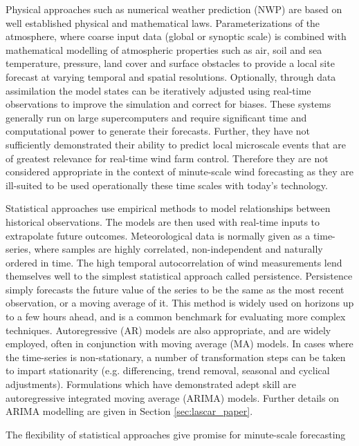 Physical approaches such as numerical weather prediction (NWP) are based on well established physical and mathematical laws. Parameterizations of the atmosphere, where coarse input data (global or synoptic scale) is combined with mathematical modelling of atmospheric properties such as air, soil and sea temperature, pressure, land cover and surface obstacles to provide a local site forecast at varying temporal and spatial resolutions. Optionally, through data assimilation the model states can be iteratively adjusted using real-time observations to improve the simulation and correct for biases. These systems generally run on large supercomputers and require significant time and computational power to generate their forecasts. Further, they have not sufficiently demonstrated their ability to predict local microscale events that are of greatest relevance for real-time wind farm control. Therefore they are not considered appropriate in the context of minute-scale wind forecasting as they are ill-suited to be used operationally these time scales with today's technology.

Statistical approaches use empirical methods to model relationships between historical observations. The models are then used with real-time inputs to extrapolate future outcomes. Meteorological data is normally given as a time-series, where samples are highly correlated, non-independent and naturally ordered in time. The high temporal autocorrelation of wind measurements lend themselves well to the simplest statistical approach called persistence. Persistence simply forecasts the future value of the series to be the same as the most recent observation, or a moving average of it. This method is widely used on horizons up to a few hours ahead, and is a common benchmark for evaluating more complex techniques. Autoregressive (AR) models are also appropriate, and are widely employed, often in conjunction with moving average (MA) models. In cases where the time-series is non-stationary, a number of transformation steps can be taken to impart stationarity (e.g. differencing, trend removal, seasonal and cyclical adjustments). Formulations which have demonstrated adept skill are autoregressive integrated moving average (ARIMA) models. Further details on ARIMA modelling are given in Section \ref{sec:lascar_paper}. 

The flexibility of statistical approaches give promise for minute-scale forecasting

